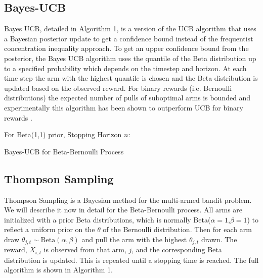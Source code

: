 \documentclass[journal,transmag]{IEEEtran}%
\begin{document}
\subsection{Bayes-UCB}
Bayes UCB, detailed in Algorithm 1, is a version of the UCB algorithm that uses a Bayesian posterior update to get a confidence bound instead of  the frequentist concentration inequality approach. To get an upper confidence bound from the posterior, the Bayes UCB algorithm uses the quantile of the Beta distribution up to a specified probability which depends on the timestep and horizon. At each time step the arm with the highest quantile is chosen and the Beta distribution is updated based on the observed reward.  For binary rewards (i.e. Bernoulli distributions) the expected number of pulls of suboptimal arms is bounded and experimentally this algorithm has been shown to outperform UCB for binary rewards \cite{kaufmann2012bayesian}.

\begin{algorithm}
 For Beta(1,1) prior, Stopping Horizon $n$: \\
 \caption{Bayes-UCB for Beta-Bernoulli Process}
\end{algorithm}


\subsection{Thompson Sampling}
Thompson Sampling is a Bayesian method for the multi-armed bandit problem. We will describe it now in detail for the Beta-Bernoulli process. All arms are initialized with a prior Beta distributions, which is normally Beta($\alpha=1$,$\beta =1$) to reflect a uniform prior on the $\theta$ of the Bernoulli distribution. Then for each arm draw $\theta_{j,t} \sim \mbox{Beta}(\alpha,\beta)$ and pull the arm with the highest $\theta_{j,t}$ drawn. The reward, $X_{i,t}$ is observed from that arm, $j$, and the corresponding Beta distribution is updated. This is repeated until a stopping time is reached. The full algorithm is shown in Algorithm 1.  
\end{document}
